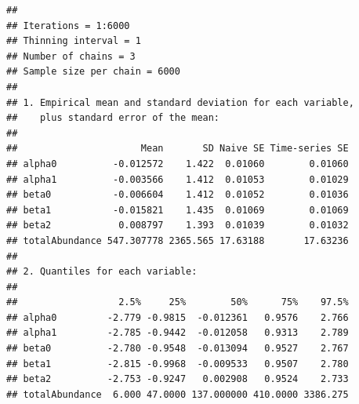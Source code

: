 \documentclass[
]{article}
\begin{document}
\begin{verbatim}
## 
## Iterations = 1:6000
## Thinning interval = 1 
## Number of chains = 3 
## Sample size per chain = 6000 
## 
## 1. Empirical mean and standard deviation for each variable,
##    plus standard error of the mean:
## 
##                      Mean       SD Naive SE Time-series SE
## alpha0          -0.012572    1.422  0.01060        0.01060
## alpha1          -0.003566    1.412  0.01053        0.01029
## beta0           -0.006604    1.412  0.01052        0.01036
## beta1           -0.015821    1.435  0.01069        0.01069
## beta2            0.008797    1.393  0.01039        0.01032
## totalAbundance 547.307778 2365.565 17.63188       17.63236
## 
## 2. Quantiles for each variable:
## 
##                  2.5%     25%        50%      75%    97.5%
## alpha0         -2.779 -0.9815  -0.012361   0.9576    2.766
## alpha1         -2.785 -0.9442  -0.012058   0.9313    2.789
## beta0          -2.780 -0.9548  -0.013094   0.9527    2.767
## beta1          -2.815 -0.9968  -0.009533   0.9507    2.780
## beta2          -2.753 -0.9247   0.002908   0.9524    2.733
## totalAbundance  6.000 47.0000 137.000000 410.0000 3386.275
\end{verbatim}
\end{document}
